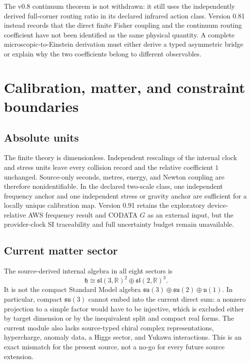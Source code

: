 \documentclass[11pt]{article}
\theoremstyle{definition}
\theoremstyle{remark}
\begin{document}
The v0.8 continuum theorem is not withdrawn: it still uses the independently derived full-corner routing ratio in its declared infrared action class. Version 0.81 instead records that the direct finite Fisher coupling and the continuum routing coefficient have not been identified as the same physical quantity. A complete microscopic-to-Einstein derivation must either derive a typed asymmetric bridge or explain why the two coefficients belong to different observables.

\section{Calibration, matter, and constraint boundaries}\label{sec:boundaries081}

\subsection{Absolute units}

The finite theory is dimensionless. Independent rescalings of the internal clock and stress units leave every collision record and the relative coefficient $1$ unchanged. Source-only seconds, metres, energy, and Newton coupling are therefore nonidentifiable. In the declared two-scale class, one independent frequency anchor and one independent stress or gravity anchor are sufficient for a locally unique calibration map. Version 0.91 retains the exploratory device-relative AWS frequency result and CODATA $G$ as an external input, but the provider-clock SI traceability and full uncertainty budget remain unavailable.

\subsection{Current matter sector}

The source-derived internal algebra in all eight sectors is
\begin{equation}
 \mathfrak h\cong
 \mathfrak{sl}(3,\mathbb R)^2\oplus
 \mathfrak{sl}(2,\mathbb R)^3.
\end{equation}
It is not the compact Standard Model algebra
$\mathfrak{su}(3)\oplus\mathfrak{su}(2)\oplus\mathfrak u(1)$. In particular, compact $\mathfrak{su}(3)$ cannot embed into the current direct sum: a nonzero projection to a simple factor would have to be injective, which is excluded either by target dimension or by the inequivalent split and compact real forms. The current module also lacks source-typed chiral complex representations, hypercharge, anomaly data, a Higgs sector, and Yukawa interactions. This is an exact mismatch for the present source, not a no-go for every future source extension.
\end{document}
